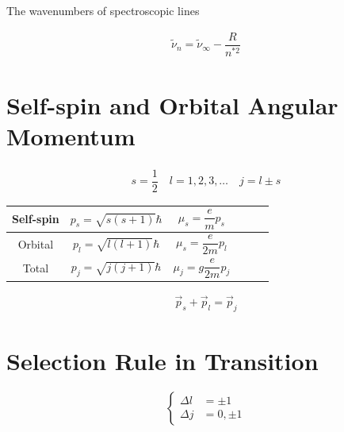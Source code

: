 The wavenumbers of spectroscopic lines

\begin{equation}
  \begin{aligned}
    \tilde{\nu}_n = \tilde{\nu}_{\infty} - \dfrac{R}{n^{*2}} 
  \end{aligned}
\end{equation}

\section{Self-spin and Orbital Angular Momentum}

\begin{equation*}
  \begin{aligned}
    s = \dfrac{1}{2} \quad l = 1,2,3,\dots \quad j = l \pm s
  \end{aligned}
\end{equation*}

\begin{table}[h]
  \centering
  \begin{tabular}{|Sc|Sc|Sc|}
    \hline
    Self-spin & $p_s = \sqrt{s \left( s + 1 \right)} \hbar$ & $\mu_s = \dfrac{e}{m} p_s $ \\
    \hline
    Orbital & $p_l = \sqrt{l \left( l + 1 \right)} \hbar$ & $\mu_s = \dfrac{e}{2m} p_l $ \\
    \hline
    Total & $p_j = \sqrt{j \left( j + 1 \right)} \hbar$ & $\mu_j = g \dfrac{e}{2m} p_j $ \\
    \hline
  \end{tabular}
\end{table}

\begin{equation*}
  \begin{aligned}
    \vec{p}_s + \vec{p}_l = \vec{p}_j
  \end{aligned}
\end{equation*}

\section{Selection Rule in Transition}

\begin{equation*}
  \left\{
    \begin{aligned}
      \Delta l &= \pm 1 \\
      \Delta j &= 0, \pm 1
    \end{aligned}
  \right.
\end{equation*}

